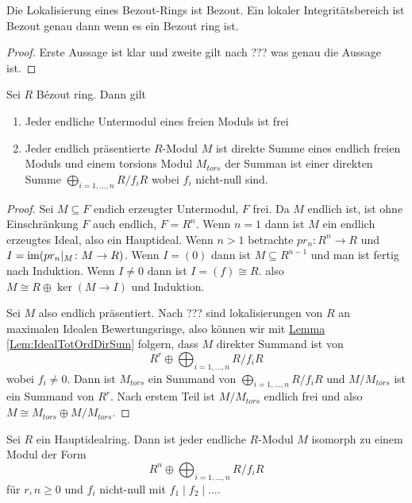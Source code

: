 \begin{Satz}
    Die Lokalisierung eines Bezout-Rings ist Bezout. Ein lokaler Integritätsbereich ist Bezout genau dann wenn es ein Bezout ring ist.
\end{Satz}
\begin{proof}
    Erste Aussage ist klar und zweite gilt nach ??? was genau die Aussage ist.
\end{proof}
\begin{Lemma}\label{Lem:StruktBezoutring}
    Sei $R$ Bézout ring. Dann gilt 
    \begin{enumerate}
        \item Jeder endliche Untermodul eines freien Moduls ist frei
        \item Jeder endlich präsentierte $R$-Modul $M$ ist direkte Summe eines endlich freien Moduls und einem torsions Modul $M_{tors}$ der Summan ist einer direkten Summe $\bigoplus_{i=1,\dots,n}R/f_iR$ wobei $f_i$ nicht-null sind.
    \end{enumerate}
\end{Lemma}
\begin{proof}
    Sei $M\subseteq F$ endich erzeugter Untermodul, $F$ frei. Da $M$ endlich ist, ist ohne Einschränkung $F$ auch endlich, $F=R^n$. Wenn $n=1$ dann ist $M$ ein endlich erzeugtes Ideal, also ein Hauptideal. Wenn $n>1$ betrachte $pr_n\colon R^n\to R$ und $I=\operatorname{im}(pr_n|_M\colon M\to R)$. Wenn $I=(0)$ dann ist $M\subseteq R^{n-1}$ und man ist fertig nach Induktion. Wenn $I\neq 0$ dann ist $I=(f)\cong R$. also $M\cong R\oplus \ker(M\to I)$ und Induktion.

    Sei $M$ also endlich präsentiert. Nach ??? sind lokalisierungen von $R$ an maximalen Idealen Bewertungsringe, also können wir mit \hyperref[Lem:IdealTotOrdDirSum]{Lemma \ref{Lem:IdealTotOrdDirSum}} folgern, dass $M$ direkter Summand ist von $$R^r\oplus\bigoplus_{i=1,\dots,n}R/f_iR$$ wobei $f_i\neq 0$. Dann ist $M_{tors}$ ein Summand von $\bigoplus_{i=1,\dots,n}R/f_iR$ und $M/M_{tors}$ ist ein Summand von $R^r$. Nach erstem Teil ist $M/M_{tors}$ endlich frei und also $M\cong M_{tors}\oplus M/M_{tors}$.
\end{proof}
\begin{Satz}\label{Satz:StruktEndlModPID}
Sei $R$ ein Hauptidealring. Dann ist jeder endliche $R$-Modul $M$ isomorph zu einem Modul der Form $$R^n\oplus\bigoplus_{i=1,\dots,n}R/f_iR$$ für $r,n\geq 0$ und $f_i$ nicht-null mit $f_1\mid f_2\mid\dots$.
    
\end{Satz}
